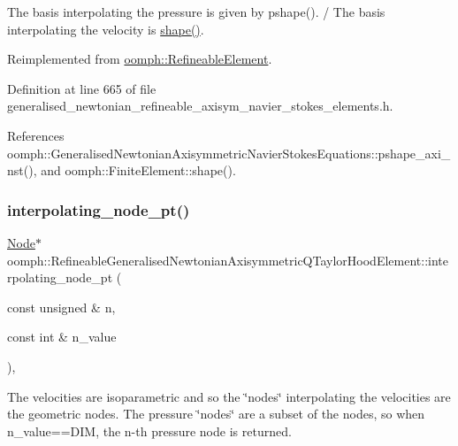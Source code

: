 The basis interpolating the pressure is given by pshape(). / The basis interpolating the velocity is \hyperlink{classoomph_1_1FiniteElement_a58a25b6859ddd43b7bfe64a19fee5023}{shape()}. 



Reimplemented from \hyperlink{classoomph_1_1RefineableElement_a8ca420443c28708e5c6315a80f520137}{oomph\+::\+Refineable\+Element}.



Definition at line 665 of file generalised\+\_\+newtonian\+\_\+refineable\+\_\+axisym\+\_\+navier\+\_\+stokes\+\_\+elements.\+h.



References oomph\+::\+Generalised\+Newtonian\+Axisymmetric\+Navier\+Stokes\+Equations\+::pshape\+\_\+axi\+\_\+nst(), and oomph\+::\+Finite\+Element\+::shape().

\mbox{\label{classoomph_1_1RefineableGeneralisedNewtonianAxisymmetricQTaylorHoodElement_a23cdbc15e3da1994d71e8b2bab5a53eb}} 
\subsubsection{\texorpdfstring{interpolating\+\_\+node\+\_\+pt()}{interpolating\_node\_pt()}}
{\footnotesize\ttfamily \hyperlink{classoomph_1_1Node}{Node}$\ast$ oomph\+::\+Refineable\+Generalised\+Newtonian\+Axisymmetric\+Q\+Taylor\+Hood\+Element\+::interpolating\+\_\+node\+\_\+pt (\begin{DoxyParamCaption}\item[{const unsigned \&}]{n,  }\item[{const int \&}]{n\+\_\+value }\end{DoxyParamCaption})\hspace{0.3cm}{\ttfamily [inline]}, {\ttfamily [virtual]}}



The velocities are isoparametric and so the \char`\"{}nodes\char`\"{} interpolating the velocities are the geometric nodes. The pressure \char`\"{}nodes\char`\"{} are a subset of the nodes, so when n\+\_\+value==D\+IM, the n-\/th pressure node is returned. 



